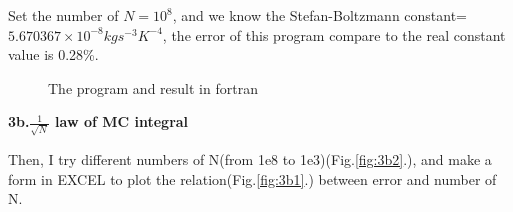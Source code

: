 \documentclass{article}
\begin{document}
Set the number of $N=10^8$, and we know the Stefan-Boltzmann constant=$5.670367 \times10^{-8} kg s^{-3} K^{-4}$, the error of this program compare to the real constant value is 0.28\%.
\begin{figure}[h]
    \centering
    \caption{The program and result  in fortran}
    \label{fig:3a2}
\end{figure}

\textbf{3b.$\frac{1}{\sqrt{N}}$ law of MC integral}

Then, I try different numbers of N(from 1e8 to 1e3)(Fig.\ref{fig:3b2}.), and make a form in EXCEL to plot the relation(Fig.\ref{fig:3b1}.) between error and number of N.
\end{document}
